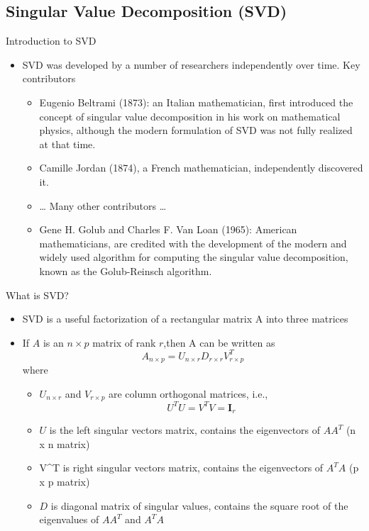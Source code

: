 \documentclass[
  ignorenonframetext,
]{beamer}
\providecommand{\tightlist}{%
  \setlength{\itemsep}{0pt}\setlength{\parskip}{0pt}}
\begin{document}
\hypertarget{singular-value-decomposition-svd}{%
\subsection{Singular Value Decomposition
(SVD)}\label{singular-value-decomposition-svd}}

\begin{frame}{Introduction to SVD}
\protect\hypertarget{introduction-to-svd}{}
\begin{itemize}
\tightlist
\item
  SVD was developed by a number of researchers independently over time.
  Key contributors

  \begin{itemize}
  \item
    Eugenio Beltrami (1873): an Italian mathematician, first introduced
    the concept of singular value decomposition in his work on
    mathematical physics, although the modern formulation of SVD was not
    fully realized at that time.
  \item
    Camille Jordan (1874), a French mathematician, independently
    discovered it.
  \item
    \ldots{} Many other contributors \ldots{}
  \item
    Gene H. Golub and Charles F. Van Loan (1965): American
    mathematicians, are credited with the development of the modern and
    widely used algorithm for computing the singular value
    decomposition, known as the Golub-Reinsch algorithm.
  \end{itemize}
\end{itemize}
\end{frame}

\begin{frame}{What is SVD?}
\protect\hypertarget{what-is-svd}{}
\begin{itemize}
\tightlist
\item
  SVD is a useful factorization of a rectangular matrix A into three
  matrices
\item
  If \(A\) is an \(n\times p\) matrix of rank \(r\),then A can be
  written as
  \[A_{n\times p} = U_{n\times r} D_{r\times r} V_{r\times p}^T\] where

  \begin{itemize}
  \tightlist
  \item
    \(U_{n\times r}\) and \(V_{r\times p}\) are column orthogonal
    matrices, i.e., \[U^TU=V^TV=\mathbf I_{r}\]
  \item
    \(U\) is the left singular vectors matrix, contains the eigenvectors
    of \(AA^T\) (n x n matrix)
  \item
    V\^{}T is right singular vectors matrix, contains the eigenvectors
    of \(A^TA\) (p x p matrix)
  \item
    \(D\) is diagonal matrix of singular values, contains the square
    root of the eigenvalues of \(AA^T\) and \(A^TA\)
  \end{itemize}
\end{itemize}
\end{frame}
\end{document}
